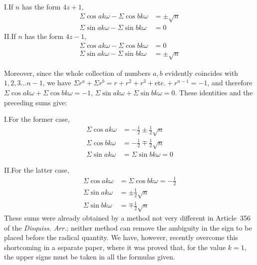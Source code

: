 \noindent I.\quad If $n$ has the form $4z+1$,
\[
\begin{aligned}
\Sigma\cos ak\omega-\Sigma\cos bk\omega&=\pm\surd n\\
\Sigma\sin ak\omega-\Sigma\sin bk\omega&=0
\end{aligned}
\]
\noindent II.\quad If $n$ has the form $4z-1$,
\[
\begin{aligned}
\Sigma\cos ak\omega-\Sigma\cos bk\omega&=0\\
\Sigma\sin ak\omega-\Sigma\sin bk\omega&=\pm\surd n
\end{aligned}
\]

Moreover, since the whole collection of numbers $a,b$ evidently coincides with $1,2,3\dots n-1$, we have $\Sigma r^a+\Sigma r^b=r+r^2+r^3+\text{etc.}+r^{n-1}=-1$, and therefore $\Sigma\cos ak\omega+\Sigma\cos bk\omega=-1$, $\Sigma\sin ak\omega+\Sigma\sin bk\omega=0$. These identities and the preceding sums give:

\noindent I.\quad For the former case,
\[
\begin{aligned}
\Sigma\cos ak\omega&=-\tfrac12\pm\tfrac12\surd n\\
\Sigma\cos bk\omega&=-\tfrac12\mp\tfrac12\surd n\\
\Sigma\sin ak\omega&=\Sigma\sin bk\omega=0
\end{aligned}
\]

\noindent II.\quad For the latter case,
\[
\begin{aligned}
\Sigma\cos ak\omega&=\Sigma\cos bk\omega=-\tfrac12\\
\Sigma\sin ak\omega&=\pm\tfrac12\surd n\\
\Sigma\sin bk\omega&=\mp\tfrac12\surd n
\end{aligned}
\]
These sums were already obtained by a method not very different in Article~356 of the \emph{Disquiss. Arr.}; neither method can remove the ambiguity in the sign to be placed before the radical quantity. We have, however, recently overcome this shortcoming in a separate paper, where it was proved that, for the value $k=1$, the upper signs must be taken in all the formulas given.
